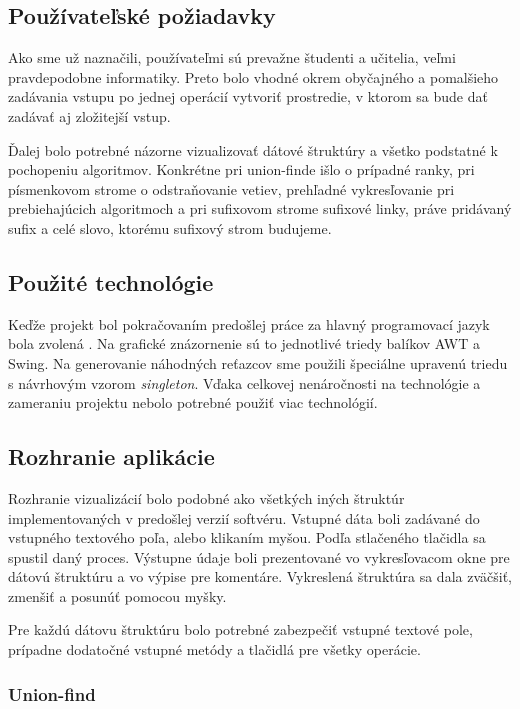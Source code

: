 \subsection{Používateľské požiadavky}

Ako sme už naznačili, používateľmi sú prevažne študenti a učitelia, veľmi 
pravdepodobne informatiky. Preto bolo vhodné okrem obyčajného a pomalšieho 
zadávania vstupu po jednej operácií vytvoriť prostredie, v ktorom sa bude dať 
zadávať aj zložitejší vstup.

Ďalej bolo potrebné názorne vizualizovať dátové štruktúry a všetko podstatné k 
pochopeniu algoritmov. Konkrétne pri union-finde išlo o prípadné ranky, 
pri písmenkovom strome o odstraňovanie vetiev, prehľadné vykresľovanie pri 
prebiehajúcich algoritmoch a pri sufixovom strome sufixové linky, práve 
pridávaný sufix a celé slovo, ktorému sufixový strom budujeme.

\subsection{Použité technológie}

Keďže projekt bol pokračovaním predošlej práce za hlavný programovací jazyk 
bola zvolená \Java. Na grafické znázornenie sú to jednotlivé triedy balíkov 
AWT a Swing. Na generovanie náhodných reťazcov sme použili špeciálne upravenú 
triedu s návrhovým vzorom \emph{singleton}. Vďaka celkovej nenáročnosti na 
technológie a zameraniu projektu nebolo potrebné použiť viac technológií.

\subsection{Rozhranie aplikácie}

Rozhranie vizualizácií bolo podobné ako všetkých iných štruktúr 
implementovaných v predošlej verzií softvéru. Vstupné dáta boli zadávané do 
vstupného textového poľa, alebo klikaním myšou. Podľa stlačeného tlačidla sa 
spustil daný proces. Výstupne údaje boli prezentované vo vykresľovacom okne 
pre dátovú štruktúru a vo výpise pre komentáre. Vykreslená štruktúra sa dala 
zväčšiť, zmenšiť a posunúť pomocou myšky.

Pre každú dátovu štruktúru bolo potrebné zabezpečiť vstupné textové pole, 
prípadne dodatočné vstupné metódy a tlačidlá pre všetky operácie.

\subsubsection{Union-find}

